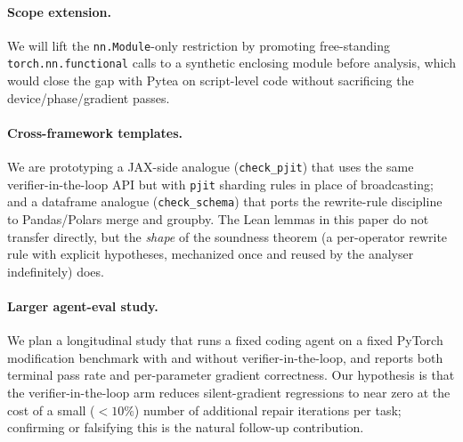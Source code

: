 \documentclass{article}
\begin{document}
\paragraph{Scope extension.} We will lift the
\texttt{nn.Module}-only restriction by promoting free-standing
\texttt{torch.nn.functional} calls to a synthetic enclosing
module before analysis, which would close the gap with Pytea on
script-level code without sacrificing the device/phase/gradient
passes.

\paragraph{Cross-framework templates.} We are prototyping a
JAX-side analogue (\texttt{check\_pjit}) that uses the same
verifier-in-the-loop API but with \texttt{pjit} sharding rules
in place of broadcasting; and a dataframe analogue
(\texttt{check\_schema}) that ports the rewrite-rule discipline
to Pandas/Polars merge and groupby. The Lean lemmas in this
paper do not transfer directly, but the \emph{shape} of the
soundness theorem (a per-operator rewrite rule with explicit
hypotheses, mechanized once and reused by the analyser
indefinitely) does.

\paragraph{Larger agent-eval study.} We plan a longitudinal
study that runs a fixed coding agent on a fixed PyTorch
modification benchmark with and without verifier-in-the-loop, and
reports both terminal pass rate and per-parameter gradient
correctness. Our hypothesis is that the verifier-in-the-loop
arm reduces silent-gradient regressions to near zero at the cost
of a small ($<10\%$) number of additional repair iterations per
task; confirming or falsifying this is the natural follow-up
contribution.
\end{document}
